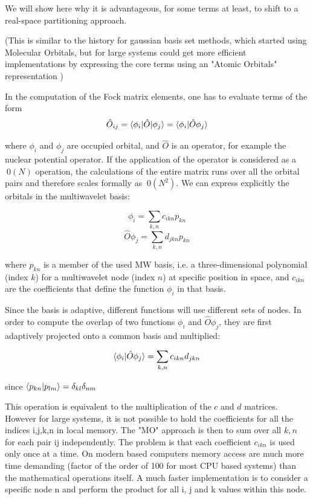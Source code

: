 \documentclass[%
 aip,
 amsmath,amssymb,
 reprint,%
]{revtex4-1}
\begin{document}
We will show here why it is advantageous, for some terms at least, to shift to a real-space partitioning approach.

(This is similar to the history for gaussian basis set methods, which started using Molecular Orbitals, but for large systems could get more efficient implementations by expressing the core terms using an "Atomic Orbitals" representation \cite{trygve})

In the computation of the Fock matrix elements, one has to evaluate terms of the form 
\begin{equation}
  {\hat O}_{ij} = \braket{\phi_{i} | {\hat O} |\phi_j}  = \braket{\phi_i | {\hat O} \phi_j} 
\end{equation}

where $\phi_i$ and $\phi_j$ are occupied orbital, and ${\hat O}$ is an operator, for example the nuclear potential operator. If the application of the operator is considered as a $~0(N)$
operation, the calculations of the entire matrix runs over all the orbital pairs and therefore scales formally as $~0(N^2)$. We can express explicitly the orbitals in the multiwavelet basis:

\begin{equation}
  \phi_i = \sum_{k,n} c_{ikn} p_{kn} 
\end{equation}
\begin{equation}
  {\hat O} \phi_j = \sum_{k,n} d_{jkn} p_{kn} 
\end{equation}

where $p_{kn}$ is a member of the used MW basis, i.e. a three-dimensional polynomial (index $k$) for a multiwavelet node (index $n$) at specific position in space, and $c_{ikn}$ are the coefficients that define the function $\phi_i$ in that basis. 

Since the basis is adaptive, different functions will use different sets of nodes. 
In order to compute the overlap of two functions $\phi_i$ and ${\hat O} \phi_j$, they are first adaptively projected onto a common basis and multiplied:

\begin{equation}
  \braket{\phi_i|{\hat O} \phi_j} = \sum_{k,n} c_{ikn}d_{jkn}
\end{equation}

since $\braket{p_{kn}|p_{lm}} = \delta_{kl}\delta_{nm}$

This operation is equivalent to the multiplication of the $c$ and $d$ matrices. However for large systems, it is not possible to hold the coefficients for all the indices i,j,k,n in local memory.
The "MO" approach is then to sum over all $k,n$ for each pair ij independently. The problem is that each coefficient $c_{ikn}$ is used only once at a time. On modern based computers memory access are much more time demanding (factor of the order of 100 for most CPU based systems) than the mathematical operations itself.  A much faster implementation is to consider a specific node n and perform the product for all i, j and k values within this node. 
\end{document}

